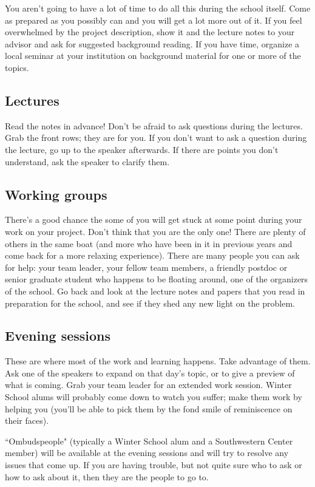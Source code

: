 \documentclass{article}
\begin{document}
You aren't going to have a lot of time to do all this during the
school itself. Come as prepared as you possibly can and you will get a
lot more out of it. If you feel overwhelmed by the project
description, show it and the lecture notes to your advisor and ask for
suggested background reading. If you have time, organize a local
seminar at your institution on background material for one or more of
the topics. 


\subsection{Lectures}
\label{sec:lectures}
Read the notes in advance!
Don't be afraid to ask questions during the lectures. Grab the front
rows; they are for you. If you don't want to ask a question during the
lecture, go up to the speaker afterwards. If there are points you
don't understand, ask the speaker to clarify them.


\subsection{Working groups}
\label{sec:working-groups}
There's a good chance the some of you will get stuck at some point
during your work on your project. Don't think that you are the only
one! There are plenty of others in the same boat (and more who have
been in it in previous years and come back for a more relaxing
experience). There are many people you can ask for help: your team
leader, your fellow team members, a friendly postdoc or senior
graduate student who happens to be floating around, one of the
organizers of the school. Go back and look at the lecture notes and
papers that you read in preparation for the school, and see if they
shed any new light on the problem.


\subsection{Evening sessions}
\label{sec:even-quest-sess}
These are where most of the work and learning happens. Take advantage
of them.  Ask one of the speakers to expand on that day's topic, or to
give a preview of what is coming. Grab your team leader for an
extended work session.  Winter School alums will probably come down to
watch you suffer; make them work by helping you (you'll be able to
pick them by the fond smile of reminiscence on their faces).

``Ombudspeople" (typically a Winter School alum and a Southwestern Center member) will be available at the evening sessions and will try to resolve any issues that come up.  If you are having trouble, but not quite sure who to ask or how to ask about it, then they are the people to go to.
\end{document}
